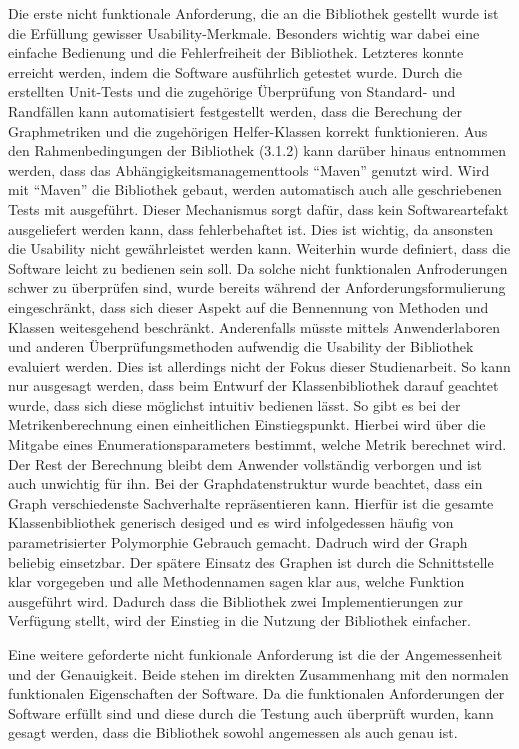 \documentclass[a4paper,12pt,ngerman,chapterprefix=false,listof=totoc,bibliography=totoc]{scrreprt}
\begin{document}
{{{Die erste nicht funktionale Anforderung, die an die Bibliothek gestellt wurde ist die Erfüllung gewisser Usability-Merkmale. Besonders wichtig war dabei eine einfache Bedienung und die Fehlerfreiheit der Bibliothek. Letzteres konnte erreicht werden, indem die Software ausführlich getestet wurde. Durch die erstellten Unit-Tests und die zugehörige Überprüfung von Standard- und Randfällen kann automatisiert festgestellt werden, dass die Berechung der Graphmetriken und die zugehörigen Helfer-Klassen korrekt funktionieren. Aus den Rahmenbedingungen der Bibliothek (3.1.2) kann darüber hinaus entnommen werden, dass das Abhängigkeitsmanagementtools "`Maven"' genutzt wird. Wird mit "`Maven"' die Bibliothek gebaut, werden automatisch auch alle geschriebenen Tests mit ausgeführt. Dieser Mechanismus sorgt dafür, dass kein Softwareartefakt ausgeliefert werden kann, dass fehlerbehaftet ist. Dies ist wichtig, da ansonsten die Usability nicht gewährleistet werden kann. Weiterhin wurde definiert, dass die Software leicht zu bedienen sein soll. Da solche nicht funktionalen Anfroderungen schwer zu überprüfen sind, wurde bereits während der Anforderungsformulierung eingeschränkt, dass sich dieser Aspekt auf die Bennennung von Methoden und Klassen weitesgehend beschränkt. Anderenfalls müsste mittels Anwenderlaboren und anderen Überprüfungsmethoden aufwendig die Usability der Bibliothek evaluiert werden. Dies ist allerdings nicht der Fokus dieser Studienarbeit. So kann nur ausgesagt werden, dass beim Entwurf der Klassenbibliothek darauf geachtet wurde, dass sich diese möglichst intuitiv bedienen lässt. So gibt es bei der Metrikenberechnung einen einheitlichen Einstiegspunkt. Hierbei wird über die Mitgabe eines Enumerationsparameters bestimmt, welche Metrik berechnet wird. Der Rest der Berechnung bleibt dem Anwender vollständig verborgen und ist auch unwichtig für ihn. Bei der Graphdatenstruktur wurde beachtet, dass ein Graph verschiedenste Sachverhalte repräsentieren kann. Hierfür ist die gesamte Klassenbibliothek generisch desiged und es wird infolgedessen häufig von parametrisierter Polymorphie Gebrauch gemacht. Dadruch wird der Graph beliebig einsetzbar. Der spätere Einsatz des Graphen ist durch die Schnittstelle klar vorgegeben und alle Methodennamen sagen klar aus, welche Funktion ausgeführt wird. Dadurch dass die Bibliothek zwei Implementierungen zur Verfügung stellt, wird der Einstieg in die Nutzung der Bibliothek einfacher.

Eine weitere geforderte nicht funkionale Anforderung ist die der Angemessenheit und der Genauigkeit. Beide stehen im direkten Zusammenhang mit den normalen funktionalen Eigenschaften der Software. Da die funktionalen Anforderungen der Software erfüllt sind und diese durch die Testung auch überprüft wurden, kann gesagt werden, dass die Bibliothek sowohl angemessen als auch genau ist.

}}}
\end{document}
